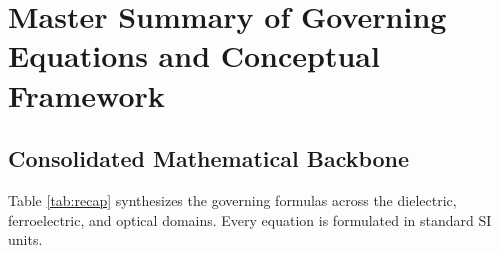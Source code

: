 \documentclass[11pt,a4paper]{article}
\begin{document}
\newpage


\newpage
\section{Master Summary of Governing Equations and Conceptual Framework}
\label{sec:master_summary}

\subsection{Consolidated Mathematical Backbone}
Table \ref{tab:recap} synthesizes the governing formulas across the dielectric, ferroelectric, and optical domains. Every equation is formulated in standard SI units.
\end{document}
